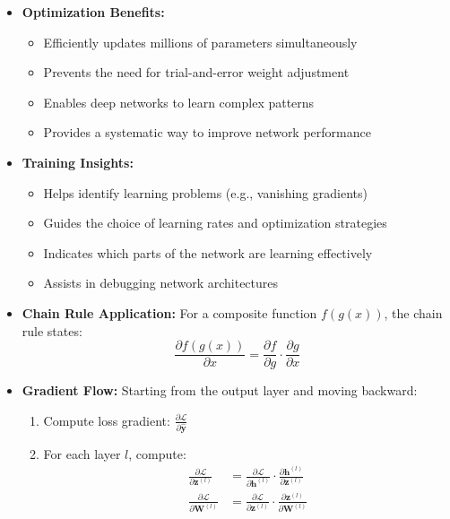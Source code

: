 \begin{itemize}
\begin{itemize}
        \item \textbf{Optimization Benefits:}
            \begin{itemize}
                \item Efficiently updates millions of parameters simultaneously
                \item Prevents the need for trial-and-error weight adjustment
                \item Enables deep networks to learn complex patterns
                \item Provides a systematic way to improve network performance
            \end{itemize}
            
        \item \textbf{Training Insights:}
            \begin{itemize}
                \item Helps identify learning problems (e.g., vanishing gradients)
                \item Guides the choice of learning rates and optimization strategies
                \item Indicates which parts of the network are learning effectively
                \item Assists in debugging network architectures
            \end{itemize}
    \end{itemize}

    \begin{itemize}
        \item \textbf{Chain Rule Application:} For a composite function $f(g(x))$, the chain rule states:
        \begin{equation}
            \frac{\partial f(g(x))}{\partial x} = \frac{\partial f}{\partial g} \cdot \frac{\partial g}{\partial x}
        \end{equation}
        
        \item \textbf{Gradient Flow:} Starting from the output layer and moving backward:
        \begin{enumerate}
            \item Compute loss gradient: $\frac{\partial \mathcal{L}}{\partial \hat{\mathbf{y}}}$
            \item For each layer $l$, compute:
                \begin{align}
                    \frac{\partial \mathcal{L}}{\partial \mathbf{z}^{(l)}} &= \frac{\partial \mathcal{L}}{\partial \mathbf{h}^{(l)}} \cdot \frac{\partial \mathbf{h}^{(l)}}{\partial \mathbf{z}^{(l)}} \\
                    \frac{\partial \mathcal{L}}{\partial \mathbf{W}^{(l)}} &= \frac{\partial \mathcal{L}}{\partial \mathbf{z}^{(l)}} \cdot \frac{\partial \mathbf{z}^{(l)}}{\partial \mathbf{W}^{(l)}}
                \end{align}
        \end{enumerate}
        

\end{itemize}
\end{itemize}

